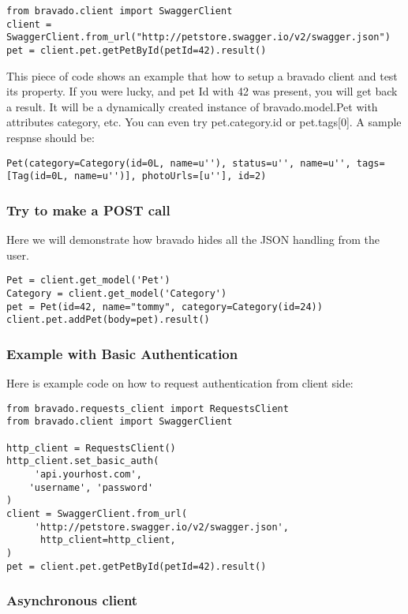\begin{lstlisting}
from bravado.client import SwaggerClient
client = SwaggerClient.from_url("http://petstore.swagger.io/v2/swagger.json")
pet = client.pet.getPetById(petId=42).result()
\end{lstlisting}

This piece of code shows an example that how to setup a bravado client
and test its property. If you were lucky, and pet Id with 42 was
present, you will get back a result. It will be a dynamically created
instance of bravado.model.Pet with attributes category, etc. You can
even try pet.category.id or pet.tags{[}0{]}. A sample respnse should be:

\begin{lstlisting}
Pet(category=Category(id=0L, name=u''), status=u'', name=u'', tags=[Tag(id=0L, name=u'')], photoUrls=[u''], id=2)
\end{lstlisting}

\subsubsection{Try to make a POST call}

Here we will demonstrate how bravado hides all the JSON handling from
the user.

\begin{lstlisting}
Pet = client.get_model('Pet')
Category = client.get_model('Category')
pet = Pet(id=42, name="tommy", category=Category(id=24))
client.pet.addPet(body=pet).result()
\end{lstlisting}

\subsubsection{Example with Basic Authentication}

Here is example code on how to request authentication from client side:

\begin{lstlisting}
from bravado.requests_client import RequestsClient
from bravado.client import SwaggerClient

http_client = RequestsClient()
http_client.set_basic_auth(
     'api.yourhost.com',
    'username', 'password'
)
client = SwaggerClient.from_url(
     'http://petstore.swagger.io/v2/swagger.json',
      http_client=http_client,
)
pet = client.pet.getPetById(petId=42).result()
\end{lstlisting}

\subsubsection{Asynchronous client}

